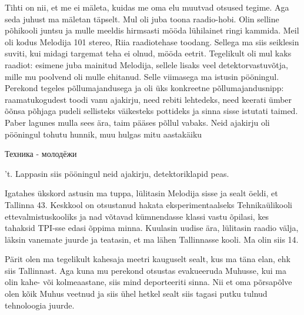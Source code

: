 

Tihti on nii, et me ei mäleta, kuidas me oma elu muutvad otsused  
tegime. Aga seda juhust ma mäletan täpselt. Mul oli juba toona 
raadio-hobi. Olin selline põhikooli juntsu ja mulle meeldis hirmsasti mööda 
lühilainet ringi kammida. Meil oli kodus  Melodija 101 stereo, Riia 
raadiotehase toodang. Sellega ma siis seiklesin suviti, kui midagi targemat 
teha ei olnud, mööda eetrit. Tegelikult oli mul kaks raadiot: esimene juba 
mainitud Melodija, sellele lisaks veel detektorvastuvõtja, mille mu poolvend 
oli mulle ehitanud. Selle viimasega ma istusin pööningul. Perekond tegeles põllumajandusega ja oli 
üks konkreetne põllumajandusnipp:  raamatukogudest toodi vanu ajakirju, 
need rebiti lehtedeks, need  keerati  ümber  õõnsa 
põhjaga pudeli sellisteks väikesteks pottideks ja  sinna sisse istutati taimed. 
Paber lagunes mulla sees ära, taim pääses põllul vabaks. Neid ajakirju oli 
pööningul tohutu hunnik, muu hulgas mitu aastakäiku 
\begin{russian}Техника - молодёжи\end{russian}'t. Lappasin siis pööningul neid ajakirju, detektoriklapid peas. 

Igatahes ükskord astusin ma tuppa, lülitasin Melodija sisse ja sealt öeldi, et 
Tallinna 43. Keskkool on otsustanud hakata 
eksperimentaalseks Tehnikaülikooli ettevalmistuskooliks ja 
nad võtavad kümnendasse klassi vastu õpilasi, kes tahaksid TPI-sse edasi õppima minna. Kuulasin uudise ära, lülitasin raadio välja, läksin vanemate juurde ja 
teatasin, et ma lähen Tallinnasse kooli. Ma olin siis 14.



Pärit olen ma tegelikult kahesaja meetri kauguselt sealt, kus ma täna elan, 
ehk siis Tallinnast. Aga kuna mu perekond otsustas evakueeruda 
Muhusse, kui ma olin kahe- või kolmeaastane, siis mind 
deporteeriti sinna. Nii et oma põrsapõlve olen kõik Muhus veetnud ja siis ühel 
hetkel sealt siis tagasi putku tulnud tehnoloogia juurde. 

